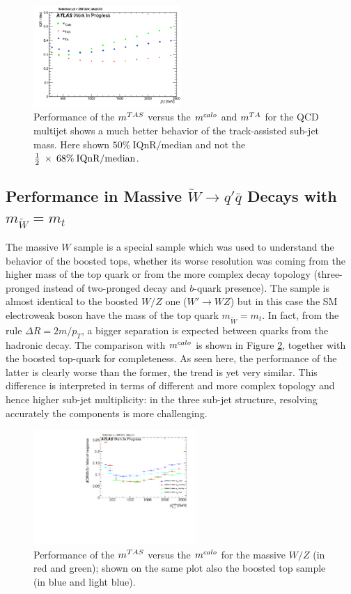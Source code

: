 \begin{figure}[!ht]
  \centering
        \includegraphics[width=0.50\textwidth]{jet_part/mtas/qcdmtastruffa.png}
   \caption[$\mtas$ for QCD jets]{Performance of the $\mtas$ versus the $m^{calo}$ and $m^{TA}$ for the QCD multijet shows a much better behavior of the track-assisted sub-jet mass. Here shown $50\% \:\textrm{IQnR/median}$ and not the $\frac{1}{2}\: \times\: 68\% \:\textrm{IQnR/median}$.}
  \label{fig:mtas5}
\end{figure}

\subsection{Performance in Massive $\tilde{W}\to q'\bar{q}$ Decays with $m_{\tilde{W}}=m_t$}
The massive $W$ sample is a special sample which was used to understand the behavior of the boosted tops, whether its worse resolution was coming from the higher mass of the top quark or from the more complex decay topology (three-pronged instead of two-pronged decay and $b$-quark presence). 
The sample is almost identical to the boosted $W/Z$ one ($W'\to WZ$) but in this case the SM electroweak boson have the mass of the top quark $m_{\tilde{W}}=m_t$.
In fact, from the rule $\Delta R=2m/p_T$, a bigger separation is expected between quarks from the hadronic decay.
The comparison with $m^{calo}$ is shown in Figure \ref{fig:mtas6}, together with the boosted top-quark for completeness. As seen here, the performance of the latter is clearly worse than the former, the trend is yet very similar. This difference is interpreted in terms of different and more complex topology and hence higher sub-jet multiplicity: in the three sub-jet structure, resolving accurately the components is more challenging.

\begin{figure}[!ht]
  \centering
     \includegraphics[width=0.55\textwidth]{jet_part/mtas/71graphcftr_h_JetRatio_mJ12CALOIQRoMcalib_WmassiveVsTops.pdf}
   \caption[$\mtas$ for boosted massive $W/Z$]{Performance of the $\mtas$ versus the $m^{calo}$ for the massive $W/Z$ (in red and green); shown on the same plot also the boosted top sample (in blue and light blue).}
  \label{fig:mtas6}
\end{figure}

